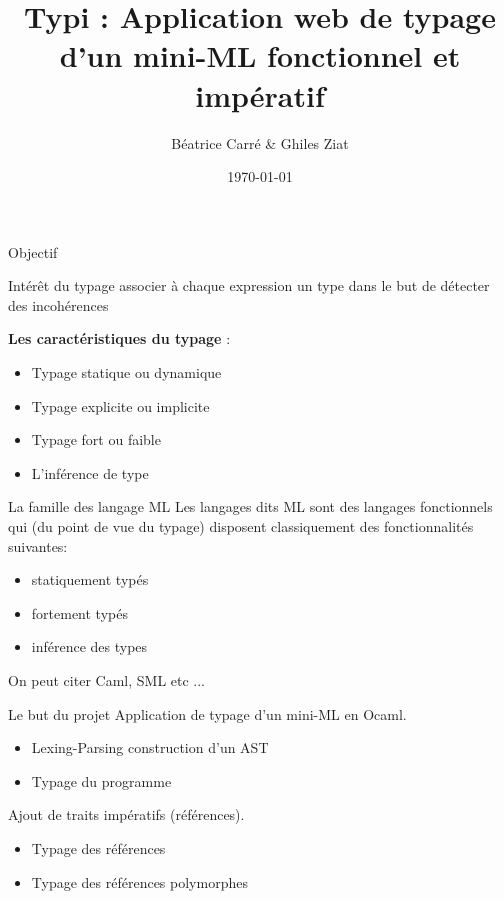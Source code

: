 \documentclass[xcolor={table,dvipsnames}]{beamer}
\title{Typi : Application web de typage d'un mini-ML fonctionnel et impératif}
\author{Béatrice Carré \& Ghiles Ziat}
\institute{Projet de Typage et Analyse Statique}
\date{\today}
\begin{document}
\maketitle







\begin{frame}{Objectif}


\begin{block}{Intérêt du typage}
associer à chaque expression un type dans le but de détecter des incohérences
\end{block}

\bigskip

\textbf{Les caractéristiques du typage} : 

  \begin{itemize}
  \item Typage statique ou dynamique
  \item Typage explicite ou implicite
  \item Typage fort ou faible
  \item L'inférence de type
  \end{itemize}


\end{frame}











\begin{frame}{La famille des langage ML}
Les langages dits ML sont des langages fonctionnels qui (du point de vue du typage) disposent classiquement des fonctionnalités suivantes:

\begin {itemize}
\item statiquement typés
\item fortement typés
\item inférence des types 
\end {itemize}
\medskip
On peut citer Caml, SML etc ...
\end{frame}




\begin{frame}{Le but du projet}
Application de typage d'un mini-ML en Ocaml.
\begin{itemize}
\item Lexing-Parsing construction d'un AST 
\item Typage du programme
\end{itemize}
\bigskip

Ajout de traits impératifs (références).
\begin{itemize}
\item Typage des références
\item Typage des références polymorphes
\end{itemize}
\end{frame}
\end{document}
